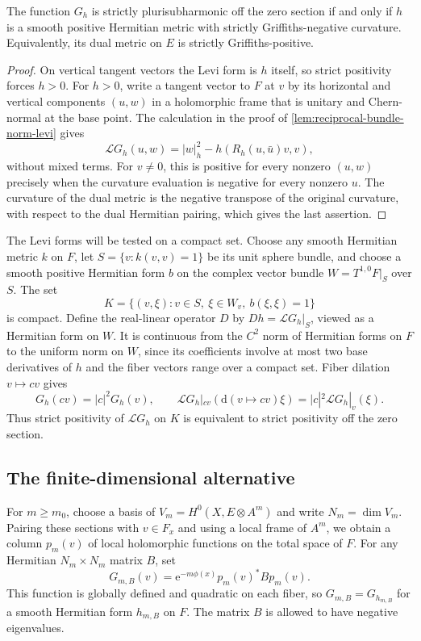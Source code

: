 \begin{lemma}\label{lem:dual-bundle-strict-levi}
The function $G_h$ is strictly plurisubharmonic off the zero section if and only if $h$ is a smooth positive Hermitian metric with strictly Griffiths-negative curvature. Equivalently, its dual metric on $E$ is strictly Griffiths-positive.
\end{lemma}
\begin{proof}
On vertical tangent vectors the Levi form is $h$ itself, so strict positivity forces $h>0$. For $h>0$, write a tangent vector to $F$ at $v$ by its horizontal and vertical components $(u,w)$ in a holomorphic frame that is unitary and Chern-normal at the base point. The calculation in the proof of \cref{lem:reciprocal-bundle-norm-levi} gives
\[
 \mathcal L G_h(u,w)=|w|_h^2-h(R_h(u,\bar u)v,v),
\]
without mixed terms. For $v\ne0$, this is positive for every nonzero $(u,w)$ precisely when the curvature evaluation is negative for every nonzero $u$. The curvature of the dual metric is the negative transpose of the original curvature, with respect to the dual Hermitian pairing, which gives the last assertion.
\end{proof}

The Levi forms will be tested on a compact set. Choose any smooth Hermitian metric $k$ on $F$, let $S=\{v:k(v,v)=1\}$ be its unit sphere bundle, and choose a smooth positive Hermitian form $b$ on the complex vector bundle $W=T^{1,0}F|_S$ over $S$. The set
\[
 K=\{(v,\xi):v\in S,\ \xi\in W_v,\ b(\xi,\xi)=1\}
\]
is compact. Define the real-linear operator $D$ by $D h=\mathcal L G_h|_S$, viewed as a Hermitian form on $W$. It is continuous from the $C^2$ norm of Hermitian forms on $F$ to the uniform norm on $W$, since its coefficients involve at most two base derivatives of $h$ and the fiber vectors range over a compact set. Fiber dilation $v\mapsto cv$ gives
\[
 G_h(cv)=|c|^2G_h(v),\qquad
 \mathcal L G_h|_{cv}(\mathrm d(v\mapsto cv)\xi)
        =|c|^2\mathcal L G_h|_v(\xi).
\]
Thus strict positivity of $\mathcal LG_h$ on $K$ is equivalent to strict positivity off the zero section.

\subsection{The finite-dimensional alternative}

For $m\geq m_0$, choose a basis of $V_m=H^0(X,E\otimes A^m)$ and write $N_m=\dim V_m$. Pairing these sections with $v\in F_x$ and using a local frame of $A^m$, we obtain a column $p_m(v)$ of local holomorphic functions on the total space of $F$. For any Hermitian $N_m\times N_m$ matrix $B$, set
\[
 G_{m,B}(v)=\mathrm e^{-m\phi(x)}p_m(v)^*B p_m(v).
\]
This function is globally defined and quadratic on each fiber, so $G_{m,B}=G_{h_{m,B}}$ for a smooth Hermitian form $h_{m,B}$ on $F$. The matrix $B$ is allowed to have negative eigenvalues.

